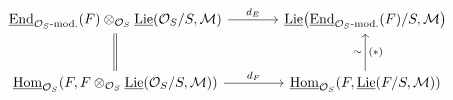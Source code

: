 \[\begin{tikzcd}[column sep=large,row sep=large]
\underline{\operatorname{End}}_{\mathcal O_S\text{-mod.}}(F)\otimes_{\mathcal O_S}\underline{\operatorname{Lie}}(\mathcal O_S/S,\mathcal M) \arrow[r,"d_E"] \arrow[d,equal] &
\underline{\operatorname{Lie}}\!\left(\underline{\operatorname{End}}_{\mathcal O_S\text{-mod.}}(F)/S,\mathcal M\right)\\
\underline{\operatorname{Hom}}_{\mathcal O_S}\!\left(F,F\otimes_{\mathcal O_S}\underline{\operatorname{Lie}}(\mathcal O_S/S,\mathcal M)\right) \arrow[r,"d_F"] &
\underline{\operatorname{Hom}}_{\mathcal O_S}\!\left(F,\underline{\operatorname{Lie}}(F/S,\mathcal M)\right) \arrow[u,"\sim" left,"(*)" right]
\end{tikzcd}\]
